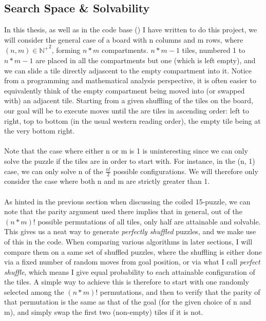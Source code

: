 \subsection{Search Space \& Solvability}

In this thesis, as well as in the code base (\cite{FB}) I have written to do this project, we will consider the general case of a board with n columns and m rows, where $(n, m) \in {\mathbb{N}^{+}}^{2}$, forming $n * m$ compartments. $n * m - 1$ tiles, numbered 1 to $n * m - 1$ are placed in all the compartments but one (which is left empty), and we can slide a tile directly adjascent to the empty compartment into it. Notice from a programming and mathematical analysis perspective, it is often easier to equivalently think of the empty compartment being moved into (or swapped with) an adjacent tile. Starting from a given shuffling of the tiles on the board, our goal will be to execute moves until the are tiles in ascending order: left to right, top to bottom (in the usual western reading order), the empty tile being at the very bottom right.
\\
\\
Note that the case where either n or m is 1 is uninteresting since we can only solve the puzzle if the tiles are in order to start with. For instance, in the (n, 1) case, we can only solve n of the $\frac{n!}{2}$ possible configurations. We will therefore only consider the case where both n and m are strictly greater than 1.
\\
\\
As hinted in the previous section when discussing the coiled 15-puzzle, we can note that the parity argument used there implies that in general, out of the $(n * m)!$ possible permutations of all tiles, only half are attainable and solvable. This gives us a neat way to generate \textit{perfectly shuffled} puzzles, and we make use of this in the code. When comparing various algorithms in later sections, I will compare them on a same set of shuffled puzzles, where the shuffling is either done via a fixed number of random moves from goal position, or via what I call \textit{perfect shuffle}, which means I give equal probability to each attainable configuration of the tiles. A simple way to achieve this is therefore to start with one randomly selected among the $(n * m)!$ permutations, and then to verify that the parity of that permutation is the same as that of the goal (for the given choice of n and m), and simply swap the first two (non-empty) tiles if it is not.




